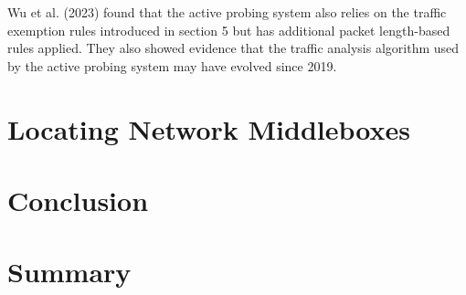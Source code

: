 Wu et al. (2023) found that the active probing system also relies on the traffic exemption rules introduced in section 5 but has additional packet length-based rules applied. They also showed evidence that the traffic analysis algorithm used by the active probing system may have evolved since 2019.\cite{wu2023great}

\section{Locating Network Middleboxes}

\section{Conclusion}

\section{Summary}